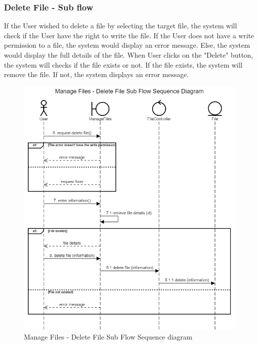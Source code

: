 \subsubsection{Delete File - Sub flow}
If the User wished to delete a file by selecting the target file, the system will check if the User have the right to write the file. If the User does not have a write permission to a file, the system would display an error message. Else, the system would display the full details of the file. When User clicks on the "Delete" button, the system will checks if the file exists or not. If the file exists, the system will remove the file. If not, the system displays an error message.
\begin{figure}[H]
    \centering
    \includegraphics[width=1.0\textwidth]{images/Manage Files - Delete File Sub Flow Sequence Diagram.png}
    \caption{Manage Files - Delete File Sub Flow Sequence diagram}
    \label{fig:SeqFilesDelete}
\end{figure}
